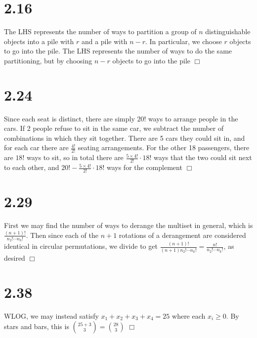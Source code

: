 \documentclass{article}
\begin{document}
\section*{2.16}
The LHS represents the number of ways to partition a group of $n$ distinguishable objects into a pile with $r$ and a pile with $n-r$. In particular, we choose $r$ objects to go into the  pile. The LHS represents the number of ways to do the same partitioning, but by choosing $n-r$ objects to go into the  pile $\Box$

\section*{2.24}
Since each seat is distinct, there are simply $20!$ ways to arrange people in the cars. If 2 people refuse to sit in the same car, we subtract the number of combinations in which they sit together. There are 5 cars they could sit in, and for each car there are $\frac{4!}{2!}$ seating arrangements. For the other 18 passengers, there are $18!$ ways to sit, so in total there are $\frac{5 \times 4!}{2!} \cdot 18!$ ways that the two could sit next to each other, and $20! - \frac{5 \times 4!}{2!} \cdot 18!$ ways for the complement $\Box$

\section*{2.29}
First we may find the number of ways to derange the multiset in general, which is $\frac{(n+1)!}{n_2! \cdots n_k!}$. Then since each of the $n+1$ rotations of a derangement are considered identical in circular permutations, we divide to get $\frac{(n+1)!}{(n+1)n_2! \cdots n_k!} = \frac{n!}{n_2! \cdots n_k!}$, as desired $\Box$

\section*{2.38}
WLOG, we may instead satisfy $x_1 + x_2 + x_3 + x_4 = 25$ where each $x_i \geq 0$. By stars and bars, this is $\binom{25 + 3}{3} = \binom{28}{3}$ $\Box$
\end{document}
